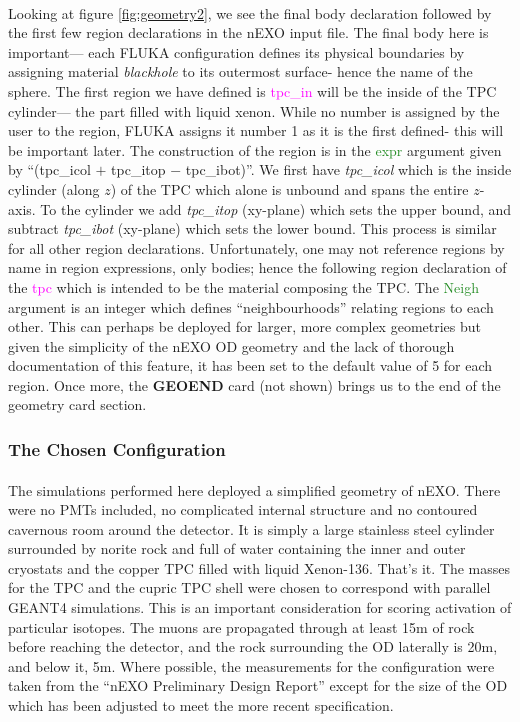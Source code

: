 \paragraph{}
Looking at figure \ref{fig:geometry2}, we see the final body declaration followed by the first few region declarations in the nEXO input file. The final body here is important— each FLUKA configuration defines its physical boundaries by assigning material \textit{blackhole} to its outermost surface- hence the name of the sphere. The first region we have defined is \textcolor{magenta}{tpc\_in} will be the inside of the TPC cylinder— the part filled with liquid xenon. While no number is assigned by the user to the region, FLUKA assigns it number 1 as it is the first defined- this will be important later. The construction of the region is in the \textcolor{ForestGreen}{expr} argument given by ``(tpc\_icol $+$ tpc\_itop $-$ tpc\_ibot)''. We first have \textit{tpc\_icol} which is the inside cylinder (along $z$) of the TPC which alone is unbound and spans the entire $z$-axis. To the cylinder we add \textit{tpc\_itop} (xy-plane) which sets the upper bound, and subtract \textit{tpc\_ibot} (xy-plane) which sets the lower bound. This process is similar for all other region declarations. Unfortunately, one may not reference regions by name in region expressions, only bodies; hence the following region declaration of the \textcolor{magenta}{tpc} which is intended to be the material composing the TPC. The \textcolor{ForestGreen}{Neigh} argument is an integer which defines ``neighbourhoods'' relating regions to each other. This can perhaps be deployed for larger, more complex geometries but given the simplicity of the nEXO OD geometry and the lack of thorough documentation of this feature, it has been set to the default value of 5 for each region. Once more, the \textbf{GEOEND} card (not shown) brings us to the end of the geometry card section.

\subsubsection{The Chosen Configuration}
\paragraph{}
The simulations performed here deployed a simplified geometry of nEXO. There were no PMTs included, no complicated internal structure and no contoured cavernous room around the detector. It is simply a large stainless steel cylinder surrounded by norite rock \cite{olivia_scallon} and full of water containing the inner and outer cryostats and the copper TPC filled with liquid Xenon-136. That's it. The masses for the TPC and the cupric TPC shell were chosen to correspond with parallel GEANT4 simulations. This is an important consideration for scoring activation of particular isotopes. The muons are propagated through at least 15m of rock before reaching the detector, and the rock surrounding the OD laterally is 20m, and below it, 5m. Where possible, the measurements for the configuration were taken from the ``nEXO Preliminary Design Report'' except for the size of the OD which has been adjusted to meet the more recent specification.

